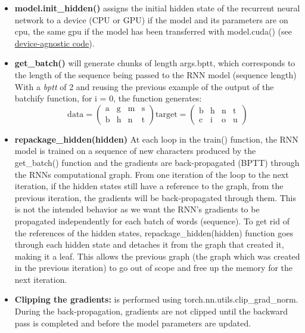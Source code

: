 \documentclass[11pt]{article}
\newcommand{\0}{\mat{0}}
\begin{document}
\begin{itemize}
\begin{itemize}
	\item \textbf{model.init\_hidden()}  assigns the initial hidden state of the recurrent neural network to a device (CPU or GPU)
	if the model and its parameters are on cpu, the same gpu if the model has been transferred with model.cuda()
	(see \href{https://github.com/pytorch/pytorch/blob/master/docs/source/notes/cuda.rst}{device-agnostic code}).
	\item \textbf{get\_batch()} will  generate chunks of length args.bptt, which corresponds to the length of the sequence being passed to the RNN model (sequence length) 
	With a \textit{bptt} of 2 and reusing the previous example of the output of the batchify function, for i = 0, the function generates: 
	\[ \text{data}=\left(  \begin{array}{cccc}
			\text{a} &  \text{g} & \text{m} & \text{s}  \\
			\text{b}  &  \text{h} & \text{n} & \text{t}
		   \end{array} \right)
	 \text{target}=\left(\begin{array}{cccc}
			 \text{b}  &  \text{h} & \text{n} & \text{t} \\
			\text{c}  &  \text{i} & \text{o} & \text{u}
		\end{array} \right)
	\]
	
	\item \textbf{repackage\_hidden(hidden)}  At each loop in the train() function, the RNN model is trained on a sequence of new characters produced by the  get\_batch() function and the gradients are back-propagated (BPTT) through the RNNs computational graph. From one iteration of the loop to the next iteration, if the hidden states still have a reference to the graph, from the previous iteration, the gradients will be back-propagated through them. This is not the intended behavior as we want the RNN's gradients to be propagated independently for each batch of words (sequence). To get rid of the references of the hidden states, repackage\_hidden(hidden) function  goes through each hidden state and detaches it from the graph that created it, making it a leaf. This allows the previous graph (the graph which was created in the previous iteration) to go out of scope and free up the memory for the next iteration.

	\item \textbf{Clipping the gradients:} is performed using  torch.nn.utils.clip\_grad\_norm. During the back-propagation, gradients are not clipped until the backward pass is completed and before the model parameters are updated.
	\end{itemize}
		   

\end{itemize}
\end{document}
